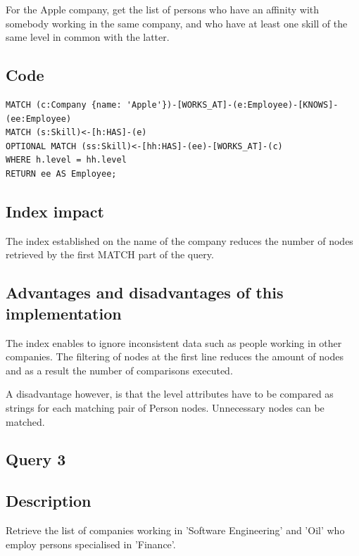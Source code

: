 \documentclass[a4paper, 11pt, titlepage]{article}
\begin{document}
\noindent
For the Apple company, get the list of persons who have an affinity with somebody working in the same company, and who have at least one skill of the same level in common with the latter.


\subsection* {Code}

\begin{verbatim}
MATCH (c:Company {name: 'Apple'})-[WORKS_AT]-(e:Employee)-[KNOWS]-(ee:Employee)
MATCH (s:Skill)<-[h:HAS]-(e)
OPTIONAL MATCH (ss:Skill)<-[hh:HAS]-(ee)-[WORKS_AT]-(c)
WHERE h.level = hh.level
RETURN ee AS Employee;
\end{verbatim}


\subsection* {Index impact}

\noindent
The index established on the name of the company reduces the number of nodes retrieved by the first MATCH part of the query.



\subsection* {Advantages and disadvantages of this implementation}

\noindent
The index enables to ignore inconsistent data such as people working in other companies. The filtering of nodes at the first line reduces the amount of nodes and as a result the number of comparisons executed.

\noindent
A disadvantage however, is that the level attributes have to be compared as strings for each matching pair of Person nodes. Unnecessary nodes can be matched.


\subsection {Query 3}

\subsection* {Description}

\noindent
Retrieve the list of companies working in 'Software Engineering' and 'Oil' who employ persons specialised in 'Finance'.
\end{document}
